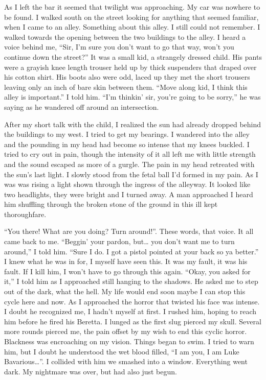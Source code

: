 As I left the bar it seemed that twilight was approaching. My car
was nowhere to be found. I walked south on the street looking for
anything that seemed familiar, when I came to an alley. Something
about this alley. I still could not remember. I walked towards the
opening between the two buildings to the alley. I heard a voice
behind me, ``Sir, I'm sure you don't want to go that way, won't you
continue down the street?'' It was a small kid, a strangely dressed
child. His pants were a grayish knee length trouser held up by
thick suspenders that draped over his cotton shirt. His boots also
were odd, laced up they met the short trousers leaving only an inch
of bare skin between them. ``Move along kid, I think this alley is
important.'' I told him. ``I'm thinkin' sir, you're going to be
sorry,'' he was saying as he wandered off around an
intersection.



After my short talk with the child, I realized the sun had already
dropped behind the buildings to my west. I tried to get my
bearings. I wandered into the alley and the pounding in my head had
become so intense that my knees buckled. I tried to cry out in
pain, though the intensity of it all left me with little strength
and the sound escaped as more of a gurgle. The pain in my head
retreated with the sun's last light. I slowly stood from the fetal
ball I'd formed in my pain. As I was was rising a light shown
through the ingress of the alleyway. It looked like two headlights,
they were bright and I turned away. A man approached I heard him
shuffling through the broken stone of the ground in this ill kept
thoroughfare.



``You there! What are you doing? Turn around!''. These words, that
voice. It all came back to me. ``Beggin' your pardon, but{\ldots} you
don't want me to turn around,'' I told him. ``Sure I do. I got a
pistol pointed at your back so ya better.'' I knew what he was in
for, I myself have seen this. It was my fault, it was his fault. If
I kill him, I won't have to go through this again. ``Okay, you asked
for it,'' I told him as I approached still hanging to the shadows.
He asked me to step out of the dark, what the hell. My life would
end soon maybe I can stop this cycle here and now. As I approached
the horror that twisted his face was intense. I doubt he recognized
me, I hadn't myself at first. I rushed him, hoping to reach him
before he fired his Beretta. I lunged as the first slug pierced my
skull. Several more rounds pierced me, the pain offset by my wish
to end this cyclic horror. Blackness was encroaching on my vision.
Things began to swim. I tried to warn him, but I doubt he
understood the wet blood filled, ``I am you, I am Luke
Bavarious{\ldots}''. I collided with him we smashed into a window.
Everything went dark. My nightmare was over, but had also just
begun. 
 



